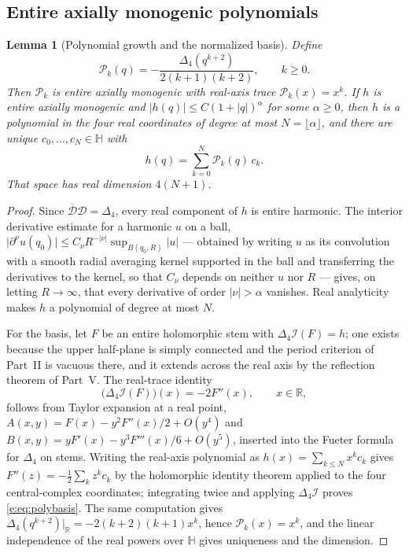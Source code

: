 \documentclass[11pt,a4paper]{article}
\numberwithin{equation}{section}
\newtheorem{lemma}[theorem]{Lemma}
\theoremstyle{definition}
\theoremstyle{remark}
\theoremstyle{plain}
\newcommand{\HH}{\mathbb H}
\newcommand{\RR}{\mathbb R}
\newcommand{\Dop}{\mathcal D}
\newcommand{\lap}{\Delta_4}
\newcommand{\I}{\mathcal I}
\newcommand{\abs}[1]{\lvert #1\rvert}
\begin{document}
\subsection{Entire axially monogenic polynomials}
\label{e:sec:polynomials}

\begin{lemma}[Polynomial growth and the normalized basis]
\label{e:lem:polynomial}
Define
\begin{equation}
 \mathcal P_k(q)=-\frac{\lap(q^{k+2})}{2(k+1)(k+2)},\qquad k\ge0 .
 \label{e:eq:Pk}
\end{equation}
Then $\mathcal P_k$ is entire axially monogenic with real-axis trace
$\mathcal P_k(x)=x^k$. If $h$ is entire axially monogenic and
$\abs{h(q)}\le C(1+\abs q)^\alpha$ for some $\alpha\ge0$, then $h$ is a
polynomial in the four real coordinates of degree at most
$N=\lfloor\alpha\rfloor$, and there are unique $c_0,\dots,c_N\in\HH$ with
\begin{equation}
 h(q)=\sum_{k=0}^N\mathcal P_k(q)\,c_k .
 \label{e:eq:polybasis}
\end{equation}
That space has real dimension $4(N+1)$.
\end{lemma}

\begin{proof}
Since $\overline{\Dop}\Dop=\lap$, every real component of $h$ is entire
harmonic. The interior derivative estimate for a harmonic $u$ on a ball,
$\abs{\partial^\nu u(q_0)}\le C_\nu R^{-\abs\nu}\sup_{B(q_0,R)}\abs u$
--- obtained by writing $u$ as its convolution with a smooth radial
averaging kernel supported in the ball and transferring the derivatives
to the kernel, so that $C_\nu$ depends on neither $u$ nor $R$ --- gives,
on letting $R\to\infty$, that every derivative of order $\abs\nu>\alpha$
vanishes. Real analyticity makes $h$ a polynomial of degree at most $N$.

For the basis, let $F$ be an entire holomorphic stem with
$\lap\I(F)=h$; one exists because the upper half-plane is simply
connected and the period criterion of Part~II is vacuous there, and it
extends across the real axis by the reflection theorem of Part~V. The
real-trace identity
\begin{equation}
 \bigl(\lap\I(F)\bigr)(x)=-2F''(x),\qquad x\in\RR,
 \label{e:eq:realtrace}
\end{equation}
follows from Taylor expansion at a real point,
$A(x,y)=F(x)-y^2F''(x)/2+O(y^4)$ and
$B(x,y)=yF'(x)-y^3F'''(x)/6+O(y^5)$, inserted into the Fueter formula
for $\lap$ on stems. Writing the real-axis polynomial as
$h(x)=\sum_{k\le N}x^kc_k$ gives $F''(z)=-\tfrac12\sum_kz^kc_k$ by the
holomorphic identity theorem applied to the four central-complex
coordinates; integrating twice and applying $\lap\I$ proves
\eqref{e:eq:polybasis}. The same computation gives
$\lap(q^{k+2})\big|_{\RR}=-2(k+2)(k+1)x^k$, hence
$\mathcal P_k(x)=x^k$, and the linear independence of the real powers
over $\HH$ gives uniqueness and the dimension.
\end{proof}
\end{document}
